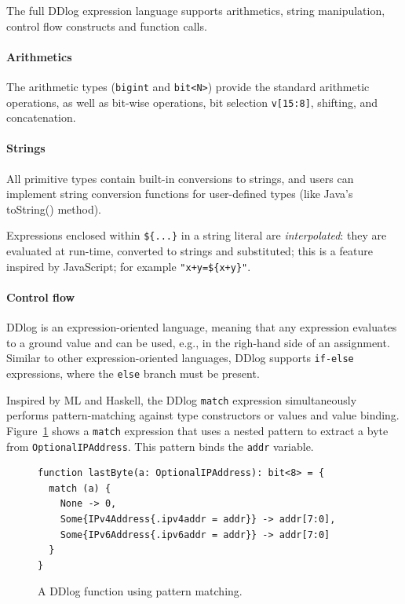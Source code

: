 The full DDlog expression language supports arithmetics, string manipulation, control
flow constructs and function calls.


\paragraph{Arithmetics}
The arithmetic types (\texttt{bigint} and \texttt{bit<N>}) provide the
standard arithmetic operations, as well as bit-wise operations, bit selection
\texttt{v[15:8]}, shifting, and concatenation.

\paragraph{Strings} All primitive types contain built-in conversions to strings, and users
can implement string conversion functions for user-defined types
(like Java's toString() method).

Expressions enclosed within \texttt{\$\{...\}} in a string literal are
\emph{interpolated}: they are evaluated at run-time, converted to
strings and substituted; this is a feature inspired by JavaScript; for
example \texttt{"x+y=\$\{x+y\}"}.

\paragraph{Control flow}

DDlog is an expression-oriented language, meaning that any expression
evaluates to a ground value and can be used, e.g., in the righ-hand side
of an assignment.  Similar to other expression-oriented languages,
DDlog supports \texttt{if-else} expressions, where the \texttt{else} branch
must be present.

Inspired by ML and Haskell, the DDlog \texttt{match} expression
simultaneously performs pattern-matching against type constructors or
values and value binding.  Figure~\ref{fig:function} shows a
\texttt{match} expression that uses a nested pattern to extract a byte from
\texttt{OptionalIPAddress}.  This pattern binds the \texttt{addr}
variable.

\begin{figure}[t]
  \small
  \begin{lstlisting}[language=ddlog]
function lastByte(a: OptionalIPAddress): bit<8> = {
  match (a) {
    None -> 0,
    Some{IPv4Address{.ipv4addr = addr}} -> addr[7:0],
    Some{IPv6Address{.ipv6addr = addr}} -> addr[7:0]
  }
}
  \end{lstlisting}
\caption{A DDlog function using pattern matching.\label{fig:function}}
\end{figure}

